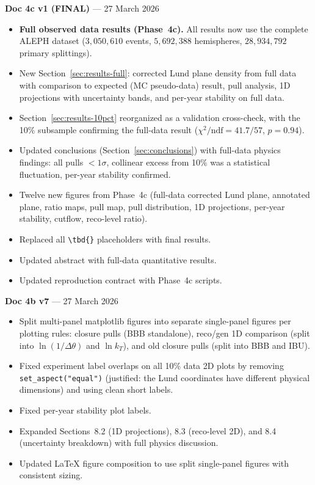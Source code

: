 \documentclass[11pt,a4paper]{article}
\newcommand{\tbd}[1]{\textcolor{gray}{\textit{#1}}}
\begin{document}
\textbf{Doc 4c v1 (FINAL)} --- 27 March 2026
\begin{itemize}
\item \textbf{Full observed data results (Phase~4c).}  All results now use the complete ALEPH dataset ($3{,}050{,}610$ events, $5{,}692{,}388$ hemispheres, $28{,}934{,}792$ primary splittings).
\item New Section~\ref{sec:results-full}: corrected Lund plane density from full data with comparison to expected (MC pseudo-data) result, pull analysis, 1D projections with uncertainty bands, and per-year stability on full data.
\item Section~\ref{sec:results-10pct} reorganized as a validation cross-check, with the 10\% subsample confirming the full-data result ($\chi^2/\text{ndf} = 41.7/57$, $p = 0.94$).
\item Updated conclusions (Section~\ref{sec:conclusions}) with full-data physics findings: all pulls $< 1\sigma$, collinear excess from 10\% was a statistical fluctuation, per-year stability confirmed.
\item Twelve new figures from Phase~4c (full-data corrected Lund plane, annotated plane, ratio maps, pull map, pull distribution, 1D projections, per-year stability, cutflow, reco-level ratio).
\item Replaced all \verb|\tbd{}| placeholders with final results.
\item Updated abstract with full-data quantitative results.
\item Updated reproduction contract with Phase~4c scripts.
\end{itemize}

\medskip

\textbf{Doc 4b v7} --- 27 March 2026
\begin{itemize}
\item Split multi-panel matplotlib figures into separate single-panel figures per plotting rules: closure pulls (BBB standalone), reco/gen 1D comparison (split into $\ln(1/\Delta\theta)$ and $\ln k_T$), and old closure pulls (split into BBB and IBU).
\item Fixed experiment label overlaps on all 10\% data 2D plots by removing \texttt{set\_aspect("equal")} (justified: the Lund coordinates have different physical dimensions) and using clean short labels.
\item Fixed per-year stability plot labels.
\item Expanded Sections~8.2 (1D projections), 8.3 (reco-level 2D), and 8.4 (uncertainty breakdown) with full physics discussion.
\item Updated LaTeX figure composition to use split single-panel figures with consistent sizing.
\end{itemize}
\end{document}
